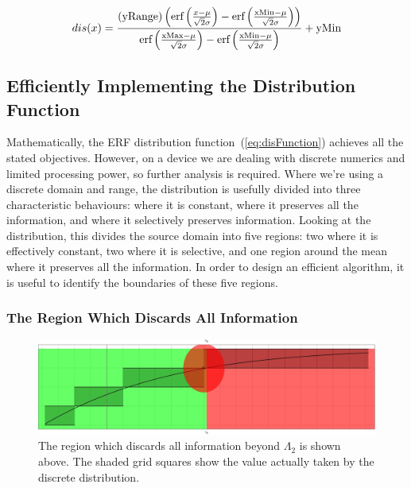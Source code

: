 \begin{equation}\label{eq:disFunction}
  dis(x) = \frac{(\text{yRange}) \left(\text{erf}\left(\frac{x-\mu }{\sqrt{2} \sigma }\right)-\text{erf}\left(\frac{\text{xMin}-\mu }{\sqrt{2} \sigma }\right)\right)}{\text{erf}\left(\frac{\text{xMax}-\mu }{\sqrt{2} \sigma }\right)-\text{erf}\left(\frac{\text{xMin}-\mu }{\sqrt{2} \sigma }\right)}+\text{yMin}
\end{equation}


\subsection{Efficiently Implementing the Distribution Function}
Mathematically, the ERF distribution function~(\ref{eq:disFunction}) achieves all the stated objectives. However, on a device we are dealing with discrete numerics and limited processing power, so further analysis is required. Where we're using a discrete domain and range, the distribution is usefully divided into three characteristic behaviours:  where it is constant, where it preserves all the information, and where it selectively preserves information. Looking at the distribution, this divides the source domain into five regions: two where it is effectively constant, two where it is selective, and one region around the mean where it preserves all the information. In order to design an efficient algorithm, it is useful to identify the boundaries of these five regions.

\newcommand{\Keep}{\Omega}
\newcommand{\keep}{\omega}
\newcommand{\eKeep}{\Omega p}
\newcommand{\ekeep}{\omega p}
\newcommand{\Discard}{\Lambda}
\newcommand{\discard}{\lambda}

\subsubsection{The Region Which Discards All Information}
\begin{figure}[h]
\centering
\includegraphics[width=0.7\linewidth]{Chapter2/Figs/EffectivlyConstantRange}
\caption{The region which discards all information beyond $\Discard_2$ is shown above. The shaded grid squares show the value actually taken by the discrete distribution.}
\label{fig:EffectivlyConstantRange}
\end{figure}


